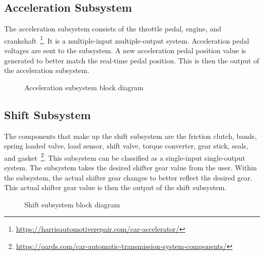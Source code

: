 \documentclass[journal,twoside,web]{ieeecolor}
\begin{document}
  \subsection{Acceleration Subsystem}
  The acceleration subsystem consists of the throttle pedal, engine, and crankshaft~\footnote{\url{https://harrisautomotiverepair.com/car-accelerator/}}. It is a multiple-input multiple-output system. 
Acceleration pedal voltages are sent to the subsystem. 
A new acceleration pedal position value is generated to better match 
the real-time pedal position. This is then the output 
of the acceleration subsystem. %
%
 \begin{figure}[htbp]
    \centering
    \caption{Acceleration subsystem block diagram}
    \label{fig:accelModelArchitecture}
 \end{figure}
 
  \subsection{Shift Subsystem}
 The components that make up the shift subsystem are the friction clutch, bands, spring loaded valve, load sensor, shift valve, torque converter, gear stick, seals, and gasket~\footnote{\url{https://oards.com/car-automatic-transmission-system-components/}}. This subsystem can be classified as a single-input single-output system. The subsystem takes the desired shifter gear value from the user. Within the subsystem, the actual shifter gear changes to better reflect the desired gear. This actual shifter gear value is then the output of the shift subsystem. 
 \begin{figure}[htbp]
    \centering
    \caption{Shift subsystem block diagram}
    \label{fig:shiftModelArchitecture}
 \end{figure} 
 
\end{document}
